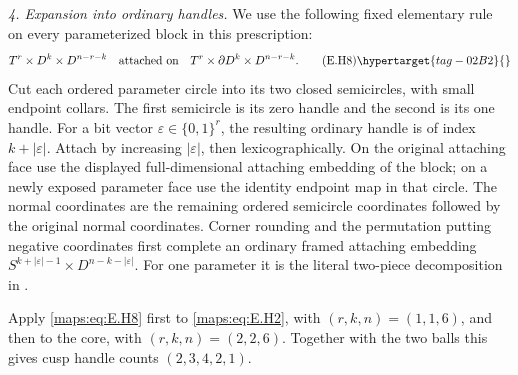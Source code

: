 \begin{theorem}
\emph{4. Expansion into ordinary handles.}
We use the following fixed elementary rule on every parameterized
block in this prescription:
\[
 T^r\times D^k\times D^{n-r-k}
 \quad\hbox{attached on}\quad
 T^r\times\partial D^k\times D^{n-r-k}.
 \tag{E.H8}\hypertarget{tag-02B2}{}\label{maps:eq:E.H8}
\]
Cut each ordered parameter circle into its two closed semicircles,
with small endpoint collars.  The first semicircle is its zero
handle and the second is its one handle.  For a bit vector
$\varepsilon\in\{0,1\}^r$, the resulting ordinary handle is of
index $k+|\varepsilon|$.  Attach by increasing $|\varepsilon|$,
then lexicographically.  On the original attaching face use
the displayed full-dimensional attaching embedding of the block;
on a newly exposed parameter face use the identity endpoint map
in that circle.  The normal coordinates are the remaining ordered
semicircle coordinates followed by the original normal coordinates.
Corner rounding and the permutation putting negative coordinates
first complete an ordinary framed attaching embedding
$S^{k+|\varepsilon|-1}\times D^{n-k-|\varepsilon|}$.
  For one parameter
it is the literal two-piece decomposition in
\cite[Section~4.1, equation~(16), p.~103]{mapsVogel09}.


Apply \eqref{maps:eq:E.H8} first to \eqref{maps:eq:E.H2}, with $(r,k,n)=(1,1,6)$, and then
to the core, with $(r,k,n)=(2,2,6)$.  Together with the two balls
this gives cusp handle counts $(2,3,4,2,1)$.


\end{theorem}
